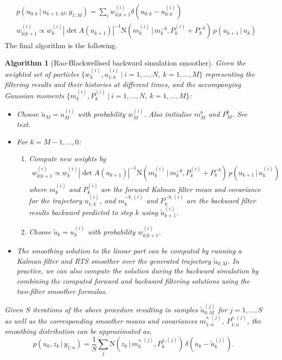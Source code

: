 \documentclass[twocolumn]{autart}    %
\newtheorem{algo}{Algorithm}[section]
\begin{document}
%
%
\begin{equation}
\begin{split}
  &p(u_{0:k}\,|\,u_{k+1:M},y_{1:M}) = \sum_i w_{k|k+1}^{(i)} \delta(u_{0:k} - u^{(i)}_{0:k}) \\
  &w_{k|k+1}^{(i)} \propto w^{(i)}_k |\det A(u_{k+1})|^{-1} \mathrm{N}(m_k^{(i)}\,|\,m^{-b}_{k},P_k^{(i)}+P^{-b}_{k}) \, p(u_{k+1}\,|\,u_{k})
\end{split}
\label{eq:rbbacksimeq}
\end{equation}
%
The final algorithm is the following.
%
\begin{algo}[Rao-Blackwellised backward simulation smoother]
  \label{alg:rbbssmooth}
  Given the weighted set of particles $\{ w_k^{(i)}, u_{1:k}^{(i)} ~|~ i=1,\ldots,N,~k=1,\ldots,M \}$ representing the filtering results and their histories at different times, and the accompanying Gaussian moments $\{ m_k^{(i)}, P_k^{(i)} ~|~ i=1,\ldots,N,~k=1,\ldots,M \}$:
\begin{itemize}
\item Choose $\tilde{u}_M = u_M^{(i)}$ with probability $w^{(i)}_{M}$. Also initialise $m_M^b$ and $P_M^b$. See text.
\item For $k=M-1,\ldots,0$:
\begin{enumerate}
  \item Compute new weights by
    \begin{equation}
      \begin{split}
        w_{k|k+1}^{(i)} \propto w^{(i)}_k |\det A(u_{k+1})|^{-1} \mathrm{N}(m_k^{(i)}\,|\,m^{-b}_{k},P_k^{(i)}+P^{-b}_{k}) \, p(u_{k+1}\,|\,u_{k}^{(i)})
     \end{split}
    \end{equation}
    where $m^{(i)}_k$ and $P^{(i)}_k$ are the forward Kalman filter mean and covariance for the trajectory $u_{1:k}^{(i)}$, and     $m^{-b,(i)}_{k}$ and $P^{-b,(i)}_{k}$ are the backward filter  results backward predicted to step $k$ using $\tilde{u}_{k+1}^{(i)}$. \item Choose $\tilde{u}_k = u_k^{(i)}$ with probability $w^{(i)}_{k|k+1}$.
  \end{enumerate}
\item The smoothing solution to the linear part can be computed by running a Kalman filter and RTS smoother over the generated trajectory $\tilde{u}_{0:M}$. In practice, we can also compute the solution during the backward simulation by combining the computed forward and backward filtering solutions using the two-filter smoother formulas.
\end{itemize}
%
Given $S$ iterations of the above procedure resulting in samples $\tilde{u}_{0:M}^{(j)}$ for $j=1,\ldots,S$ as well as the corresponding smoother means and covariances $m^{s,(j)}_{1:n}$, $P^{s,(j)}_{1:n}$, the smoothing distribution can be approximated as,
%
\begin{equation}
  p(u_k,z_k\,|\,y_{1:n})
  = \frac{1}{S} \sum_j \mathrm{N}(z_k\,|\,m_k^{s,(j)},P_k^{s,(j)}) \,
  \delta(u_k - \tilde{u}_k^{(j)}).
\nonumber
\end{equation}
\end{algo}
\end{document}
